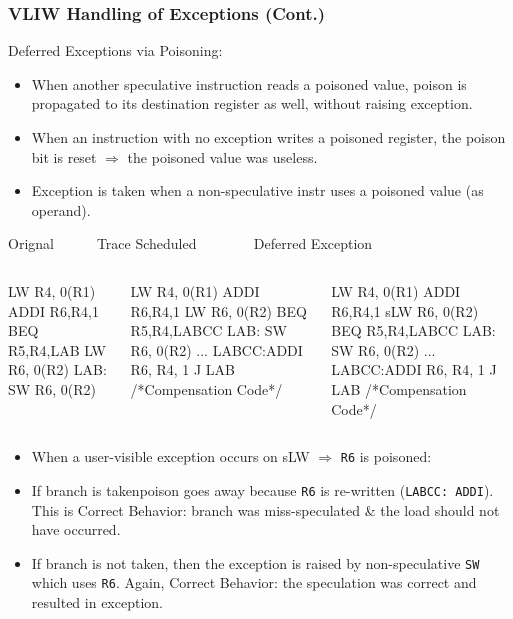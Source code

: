 \documentclass{beamer}
\renewcommand{\emph}[1]{\textcolor{structure}{#1}}
\newcommand{\emp}[1]{\textcolor{DikuRed}{ #1}}
\begin{document}
\begin{frame}[fragile,t]
    \frametitle{VLIW Handling of Exceptions (Cont.)}

Deferred Exceptions via Poisoning:
\begin{scriptsize}
\begin{itemize}
    \item When another speculative instruction reads a poisoned value, poison
            is propagated to its destination register as well, without raising 
            exception.\smallskip
    \item When an instruction with no exception writes a poisoned register,
            the poison bit is reset $\Rightarrow$ the poisoned value
            was useless.\smallskip
    \item \emp{Exception is taken when a non-speculative instr 
                uses a poisoned value (as operand)}.
\end  {itemize}
\end{scriptsize}


\smallskip

\begin{block}{Orignal{\tt~~~~~~}Trace Scheduled{\tt~~~~~~~~}Deferred Exception}\vspace{-1ex}
\begin{columns}
\begin{colorcode}[fontsize=\tiny]
      LW   R4, 0(R1)
      ADDI R6,R4,1
      BEQ  R5,R4,LAB
      LW   R6, 0(R2)
LAB:  SW   R6, 0(R2) 
\end{colorcode}
\begin{colorcode}[fontsize=\tiny]
      LW   R4, 0(R1)
      ADDI R6,R4,1
      \alert{LW   R6, 0(R2)}
      BEQ  R5,R4,LABCC
LAB:  SW   R6, 0(R2) 
...
LABCC:ADDI R6, R4, 1
      J    LAB
/*Compensation Code*/
\end{colorcode}
\begin{colorcode}[fontsize=\tiny]
      LW   R4, 0(R1)
      ADDI R6,R4,1
      \emp{sLW  R6, 0(R2)}
      BEQ  R5,R4,LABCC
LAB:  \emph{SW   R6, 0(R2)} 
...
\emph{LABCC:ADDI R6, R4, 1}
      J    LAB
/*Compensation Code*/
\end{colorcode}
\end{columns}
\end{block}


\begin{scriptsize}
\begin{itemize}
    \item When a user-visible exception occurs on \emp{sLW} $\Rightarrow$ {\tt R6} is poisoned:\smallskip
    \item If branch is taken\pause poison goes away because {\tt R6} is re-written 
            ({\tt LABCC: ADDI}). \emph{This is Correct Behavior}: branch
            was miss-speculated \& the load should not have occurred. 
    \item If branch is not taken, then the exception is raised by non-speculative
            {\tt SW} which uses {\tt R6}. \emph{Again, Correct Behavior}:
            the speculation was correct and resulted in exception.
\end  {itemize}
\end{scriptsize}


\end{frame}
\end{document}
